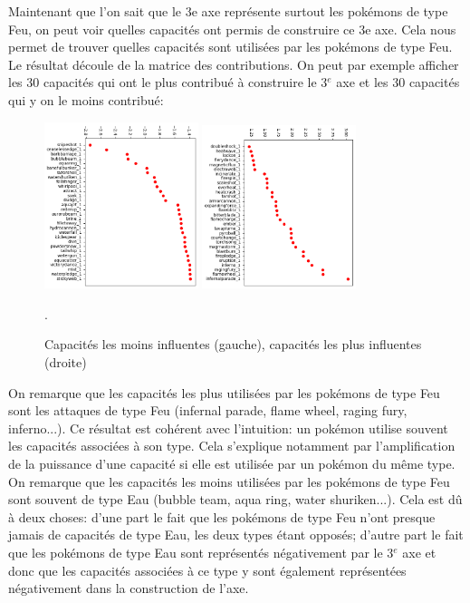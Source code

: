 \documentclass[a4paper,12pt]{article}
\begin{document}
Maintenant que l'on sait que le 3e axe représente surtout les pokémons de type
Feu, on peut voir quelles capacités ont permis de construire ce 3e axe. Cela
nous permet de trouver quelles capacités sont utilisées par les pokémons de type
Feu. Le résultat découle de la matrice des contributions. On peut par exemple
afficher les 30 capacités qui ont le plus contribué à construire le 3$^{e}$ axe
et les 30 capacités qui y on le moins contribué:
\begin{figure}[!h]
    \centering
    \includegraphics[width=0.4\textwidth]{bottom_attaques_MCA.png}
    \includegraphics[width=0.4\textwidth]{top_attaques_MCA.png}
    \caption{Capacités les moins influentes (gauche), capacités les plus
    influentes (droite)}.
    \label{fig:image3}
\end{figure}

On remarque que les capacités les plus utilisées par les pokémons de type Feu
sont les attaques de type Feu (infernal parade, flame wheel, raging fury,
inferno...). Ce résultat est cohérent avec l'intuition: un pokémon utilise
souvent les capacités associées à son type. Cela s'explique notamment par
l'amplification de la puissance d'une capacité si elle est utilisée par un
pokémon du même type. On remarque que les capacités les moins utilisées par les
pokémons de type Feu sont souvent de type Eau (bubble team, aqua ring, water
shuriken...). Cela est dû à deux choses: d'une part le fait que les pokémons de
type Feu n'ont presque jamais de capacités de type Eau, les deux types étant
opposés; d'autre part le fait que les pokémons de type Eau sont représentés
négativement par le 3$^{e}$ axe et donc que les capacités associées à ce type y
sont également représentées négativement dans la construction de l'axe.
\end{document}
